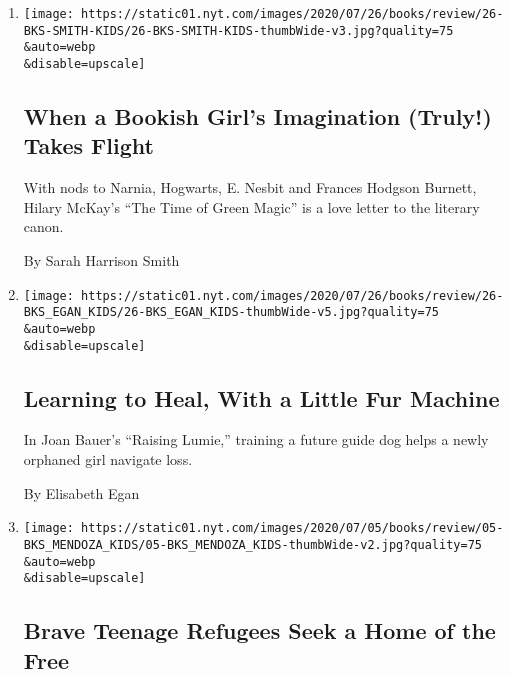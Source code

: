 \begin{enumerate}
\def\labelenumi{\arabic{enumi}.}
\item
  \href{/2020/07/24/books/review/hilary-mckay-the-time-of-green-magic.html}{}

  \texttt{[image: https://static01.nyt.com/images/2020/07/26/books/review/26-BKS-SMITH-KIDS/26-BKS-SMITH-KIDS-thumbWide-v3.jpg?quality=75\\\&auto=webp\\\&disable=upscale]}

  \hypertarget{when-a-bookish-girls-imagination-truly-takes-flight}{%
  \subsection{When a Bookish Girl's Imagination (Truly!) Takes
  Flight}\label{when-a-bookish-girls-imagination-truly-takes-flight}}

  With nods to Narnia, Hogwarts, E. Nesbit and Frances Hodgson Burnett,
  Hilary McKay's ``The Time of Green Magic'' is a love letter to the
  literary canon.

  By Sarah Harrison Smith
\item
  \href{/2020/07/18/books/review/joan-bauer-raising-lumie.html}{}

  \texttt{[image: https://static01.nyt.com/images/2020/07/26/books/review/26-BKS\_EGAN\_KIDS/26-BKS\_EGAN\_KIDS-thumbWide-v5.jpg?quality=75\\\&auto=webp\\\&disable=upscale]}

  \hypertarget{learning-to-heal-with-a-little-fur-machine}{%
  \subsection{Learning to Heal, With a Little Fur
  Machine}\label{learning-to-heal-with-a-little-fur-machine}}

  In Joan Bauer's ``Raising Lumie,'' training a future guide dog helps a
  newly orphaned girl navigate loss.

  By Elisabeth Egan
\item
  \href{/2020/06/27/books/review/we-are-not-from-here-jenny-torres-sanchez.html}{}

  \texttt{[image: https://static01.nyt.com/images/2020/07/05/books/review/05-BKS\_MENDOZA\_KIDS/05-BKS\_MENDOZA\_KIDS-thumbWide-v2.jpg?quality=75\\\&auto=webp\\\&disable=upscale]}

  \hypertarget{brave-teenage-refugees-seek-a-home-of-the-free}{%
  \subsection{Brave Teenage Refugees Seek a Home of the
  Free}\label{brave-teenage-refugees-seek-a-home-of-the-free}}


\end{enumerate}
